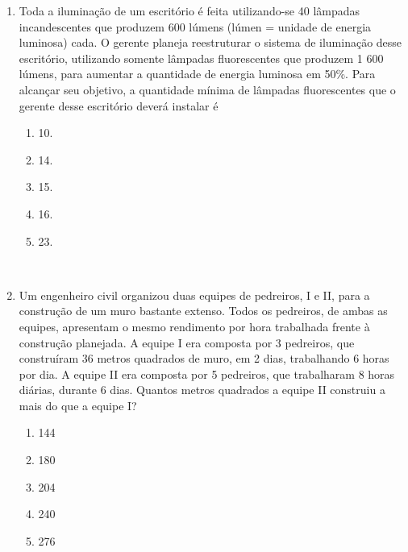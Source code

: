 \begin{enumerate}
	
	\item Toda a iluminação de um escritório é feita utilizando-se 40 lâmpadas incandescentes que produzem 600 lúmens (lúmen = unidade de energia luminosa) cada. O gerente planeja reestruturar o sistema de iluminação desse escritório, utilizando somente lâmpadas fluorescentes que produzem 1 600 lúmens, para aumentar a quantidade de energia luminosa em 50\%. Para alcançar seu objetivo, a quantidade mínima de lâmpadas fluorescentes que o gerente desse escritório deverá instalar é
	
	\begin{enumerate}
		\item 10.
		\item 14.
		\item 15.
		\item 16.
		\item 23.		
	\end{enumerate}
	
		\newpage
	 \\
	
	
	\item Um engenheiro civil organizou duas equipes de pedreiros, I e II, para a construção de um muro bastante extenso. Todos os pedreiros, de ambas as equipes, apresentam o mesmo rendimento por hora trabalhada frente à construção planejada. A equipe I era composta por 3 pedreiros, que construíram 36 metros quadrados de muro, em 2 dias, trabalhando 6 horas por dia. A equipe II era composta por 5 pedreiros, que trabalharam 8 horas diárias, durante 6 dias. 	Quantos metros quadrados a equipe II construiu a mais do que a equipe I?
	
	\begin{enumerate}
		\item 144
		\item 180
		\item 204
		\item 240
		\item 276
	\end{enumerate}

\end{enumerate}



